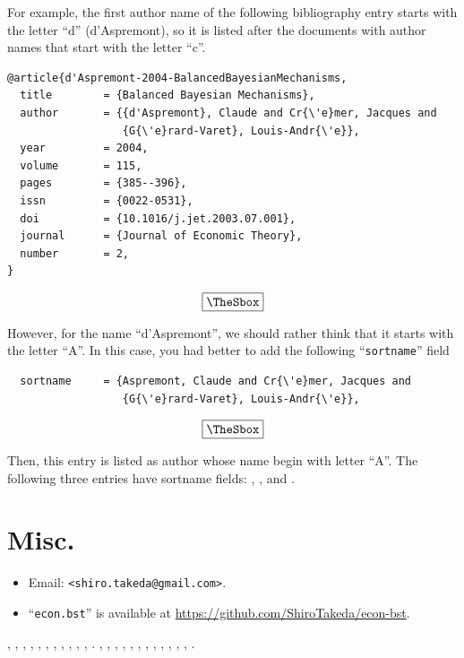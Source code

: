 \documentclass[10pt]{article}
\newenvironment{Frame}%
{\setlength{\fboxsep}{15pt}
\setlength{\mylength}{\linewidth}%
\addtolength{\mylength}{-2\fboxsep}%
\addtolength{\mylength}{-2\fboxrule}%
\Sbox
\minipage{\mylength}%
\setlength{\abovedisplayskip}{0pt}%
\setlength{\belowdisplayskip}{0pt}%
}%
{\endminipage\endSbox
\[\fbox{\TheSbox}\]}
\begin{document}
For example, the first author name of the following bibliography entry starts
with the letter ``d'' (d'Aspremont), so it is listed after the documents with
author names that start with the letter ``c''.
\begin{Frame}
\begin{verbatim}
@article{d'Aspremont-2004-BalancedBayesianMechanisms,
  title        = {Balanced Bayesian Mechanisms},
  author       = {{d'Aspremont}, Claude and Cr{\'e}mer, Jacques and
                  {G{\'e}rard-Varet}, Louis-Andr{\'e}},
  year         = 2004,
  volume       = 115,
  pages        = {385--396},
  issn         = {0022-0531},
  doi          = {10.1016/j.jet.2003.07.001},
  journal      = {Journal of Economic Theory},
  number       = 2,
}
\end{verbatim}
\end{Frame}

However, for the name ``d'Aspremont'', we should rather think that it starts
with the letter ``A''. In this case, you had better to add the following
``\texttt{sortname}'' field
\begin{Frame}
\begin{verbatim}
  sortname     = {Aspremont, Claude and Cr{\'e}mer, Jacques and
                  {G{\'e}rard-Varet}, Louis-Andr{\'e}},
\end{verbatim}
\end{Frame}

Then, this entry is listed as author whose name begin with letter ``A''. The
following three entries have sortname fields:
\citet{d'Aspremont-2004-BalancedBayesianMechanisms},
\citet{d'Aspremont-2003-CorrelationIndependenceAndBayesian}, and
\citet{d'Aspremont-1998-LinearInequalityMethodsTo}.

\section{Misc.}

\begin{itemize}
 \item Email: \verb|<shiro.takeda@gmail.com>|.
 \item ``\texttt{econ.bst}'' is available at \url{https://github.com/ShiroTakeda/econ-bst}.
\end{itemize}
\vspace*{1em}

\citet{borgers95:_note_implem_stron_domin},
\citet{bergemann11:_ration},
\citet{takeda2015a},
\citet{Takeda2014a},
\citet{Biker-2007-unemployment},
\citet{Babiker-1999-JapaneseNuclearPower},
\citet{Babiker-1999-KyotoProtocoland},
\citet{Babiker2000525},
\citet{BabikerRutherford-2005-EconomicEffectsof},
\citet{goldin:katz:2011}, \citet{goldin:katz:2008}, \citet{goldin:katz:2000}.
\citet{stakeda2019web},
\citet{Rivers-2005-CombiningTop-Downand},
\citet{WilsonMannOtsuki-2005-AssessingBenefitsof},
\citet{zhang2016Deep},
\citet{imbens2019Optimized},
\citet{essd-10-405-2018},
\citet{luthi08:_high},
\citet{doi:10.1175/2009BAMS2778.1},
\citet{d'Aspremont-2004-BalancedBayesianMechanisms},
\citet{d'Aspremont-2003-CorrelationIndependenceAndBayesian},
\citet{Chung-1999-ANoteOnMatsushima's},
\citet{d'Aspremont-1998-LinearInequalityMethodsTo},
\citet{myerson98:_exten_poiss_games_condor_jury_theor}.
\end{document}
